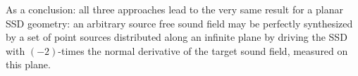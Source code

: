 As a conclusion: all three approaches lead to the very same result for a planar SSD geometry: an arbitrary source free sound field may be perfectly synthesized by a set of point sources distributed along an infinite plane by driving the SSD with $(-2)$-times the normal derivative of the target sound field, measured on this plane.



